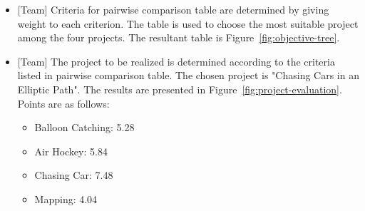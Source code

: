 \documentclass[a4paper,12pt]{article}
\begin{document}
\begin{itemize}
	
\item {[Team]} Criteria for pairwise comparison table are determined by giving weight to each criterion. The table is used to choose the most suitable project among the four projects. The resultant table is {Figure~\ref{fig:objective-tree}}.

\item {[Team]} The project to be realized is determined according to the criteria listed in pairwise comparison table. The chosen project is "Chasing Cars in an Elliptic Path". The results are presented in {Figure~\ref{fig:project-evaluation}}. Points are as follows:
\begin{itemize}
	\item Balloon Catching: 5.28
	\item Air Hockey: 5.84
	\item Chasing Car: 7.48
	\item Mapping: 4.04
\end{itemize}
 


\end{itemize}
\end{document}
